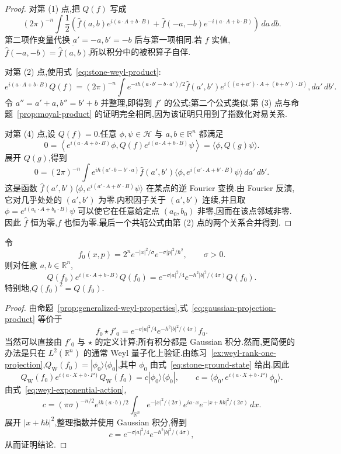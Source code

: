 {\begin{proof}
对第 (1) 点,把 $Q(f)$ 写成
\[
(2\pi)^{-n}\int\frac12\left(\widehat f(a,b)e^{i(a\cdot A+b\cdot B)}
+\widehat f(-a,-b)e^{-i(a\cdot A+b\cdot B)}\right)\,da\,db.
\]
第二项作变量代换 $a'=-a,b'=-b$ 后与第一项相同.若 $f$ 实值,$\widehat f(-a,-b)=\overline{\widehat f(a,b)}$,所以积分中的被积算子自伴.

对第 (2) 点,使用式~\eqref{eq:stone-weyl-product}:
\[
e^{i(a\cdot A+b\cdot B)}Q(f)
=(2\pi)^{-n}\int e^{-i\hbar(a\cdot b'-b\cdot a')/2}
\widehat f(a',b')e^{i((a+a')\cdot A+(b+b')\cdot B)},da'\,db'.
\]
令 $a''=a'+a,b''=b'+b$ 并整理,即得到 $f'$ 的公式;第二个公式类似.第 (3) 点与命题~\ref{prop:moyal-product} 的证明完全相同,因为该证明只用到了指数化对易关系.

对第 (4) 点,设 $Q(f)=0$.任意 $\phi,\psi\in\mathcal H$ 与 $a,b\in\mathbb R^n$ 都满足
\[
0=\left\langle e^{i(a\cdot A+b\cdot B)}\phi,
Q(f)e^{i(a\cdot A+b\cdot B)}\psi\right\rangle
=\langle\phi,Q(g)\psi\rangle.
\]
展开 $Q(g)$,得到
\[
0=(2\pi)^{-n}\int e^{i\hbar(a'\cdot b-b'\cdot a)}\widehat f(a',b')
\langle\phi,e^{i(a'\cdot A+b'\cdot B)}\psi\rangle\,da'\,db'.
\label{eq:generalized-weyl-fourier-zero}
\]
这是函数 $\widehat f(a',b')\langle\phi,e^{i(a'\cdot A+b'\cdot B)}\psi\rangle$ 在某点的逆 Fourier 变换.由 Fourier 反演,它对几乎处处的 $(a',b')$ 为零.内积因子关于 $(a',b')$ 连续,并且取 $\phi=e^{i(a_0\cdot A+b_0\cdot B)}\psi$ 可以使它在任意给定点 $(a_0,b_0)$ 非零,因而在该点邻域非零.因此 $\widehat f$ 恒为零,$f$ 也恒为零.最后一个共轭公式由第 (2) 点的两个关系合并得到.
\end{proof}

\begin{lemma}\label{lem:gaussian-projection}
令
\[
f_0(x,p)=2^n e^{-|x|^2/\sigma}e^{-\sigma|p|^2/\hbar^2},
\qquad \sigma>0.
\]
则对任意 $a,b\in\mathbb R^n$,
\[
Q(f_0)e^{i(a\cdot A+b\cdot B)}Q(f_0)
=e^{-\sigma|a|^2/4}e^{-\hbar^2|b|^2/(4\sigma)}Q(f_0).
\label{eq:gaussian-projection-product}
\]
特别地,$Q(f_0)^2=Q(f_0)$.
\end{lemma}

\begin{proof}
由命题~\ref{prop:generalized-weyl-properties},式~\eqref{eq:gaussian-projection-product} 等价于
\[
f_0\star f'_0=e^{-\sigma|a|^2/4}e^{-\hbar^2|b|^2/(4\sigma)}f_0.
\]
当然可以直接由 $f'_0$ 与 $\star$ 的定义计算;所有积分都是 Gaussian 积分.然而,更简便的办法是只在 $L^2(\mathbb R^n)$ 的通常 Weyl 量子化上验证.由练习~\ref{ex:weyl-rank-one-projection},$Q_{\mathrm W}(f_0)=|\phi_0\rangle\langle\phi_0|$,其中 $\phi_0$ 由式~\eqref{eq:stone-ground-state} 给出.因此
\[
Q_{\mathrm W}(f_0)e^{i(a\cdot X+b\cdot P)}Q_{\mathrm W}(f_0)
=c|\phi_0\rangle\langle\phi_0|,
\qquad
c=\langle\phi_0,e^{i(a\cdot X+b\cdot P)}\phi_0\rangle.
\]
由式~\eqref{eq:weyl-exponential-action},
\[
c=(\pi\sigma)^{-n/2}e^{i\hbar(a\cdot b)/2}
\int_{\mathbb R^n}e^{-|x|^2/(2\sigma)}e^{ia\cdot x}
e^{-|x+\hbar b|^2/(2\sigma)}\,dx.
\]
展开 $|x+\hbar b|^2$,整理指数并使用 Gaussian 积分,得到
\[
c=e^{-\sigma|a|^2/4}e^{-\hbar^2|b|^2/(4\sigma)},
\]
从而证明结论.
\end{proof}

}


